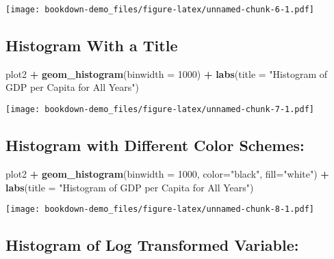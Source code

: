 \documentclass[
]{book}
\newenvironment{Shaded}{\begin{snugshade}}{\end{snugshade}}
\newcommand{\DataTypeTok}[1]{\textcolor[rgb]{0.13,0.29,0.53}{#1}}
\newcommand{\DecValTok}[1]{\textcolor[rgb]{0.00,0.00,0.81}{#1}}
\newcommand{\KeywordTok}[1]{\textcolor[rgb]{0.13,0.29,0.53}{\textbf{#1}}}
\newcommand{\NormalTok}[1]{#1}
\newcommand{\OperatorTok}[1]{\textcolor[rgb]{0.81,0.36,0.00}{\textbf{#1}}}
\newcommand{\StringTok}[1]{\textcolor[rgb]{0.31,0.60,0.02}{#1}}
\begin{document}
\texttt{[image: bookdown-demo\_files/figure-latex/unnamed-chunk-6-1.pdf]}

\pagebreak

\hypertarget{histogram-with-a-title}{%
\subsection{Histogram With a Title}\label{histogram-with-a-title}}

\begin{Shaded}
\begin{Highlighting}[]
\NormalTok{plot2 }\OperatorTok{+}\StringTok{ }
\StringTok{  }\KeywordTok{geom_histogram}\NormalTok{(}\DataTypeTok{binwidth =} \DecValTok{1000}\NormalTok{) }\OperatorTok{+}
\StringTok{  }\KeywordTok{labs}\NormalTok{(}\DataTypeTok{title =} \StringTok{"Histogram of GDP per Capita for All Years"}\NormalTok{)}
\end{Highlighting}
\end{Shaded}

\texttt{[image: bookdown-demo\_files/figure-latex/unnamed-chunk-7-1.pdf]}

\pagebreak

\hypertarget{histogram-with-different-color-schemes}{%
\subsection{Histogram with Different Color Schemes:}\label{histogram-with-different-color-schemes}}

\begin{Shaded}
\begin{Highlighting}[]
\NormalTok{plot2 }\OperatorTok{+}\StringTok{ }
\StringTok{  }\KeywordTok{geom_histogram}\NormalTok{(}\DataTypeTok{binwidth =} \DecValTok{1000}\NormalTok{, }\DataTypeTok{color=}\StringTok{"black"}\NormalTok{, }\DataTypeTok{fill=}\StringTok{"white"}\NormalTok{) }\OperatorTok{+}
\StringTok{  }\KeywordTok{labs}\NormalTok{(}\DataTypeTok{title =} \StringTok{"Histogram of GDP per Capita for All Years"}\NormalTok{)}
\end{Highlighting}
\end{Shaded}

\texttt{[image: bookdown-demo\_files/figure-latex/unnamed-chunk-8-1.pdf]}

\pagebreak

\hypertarget{histogram-of-log-transformed-variable}{%
\subsection{Histogram of Log Transformed Variable:}\label{histogram-of-log-transformed-variable}}
\end{document}
